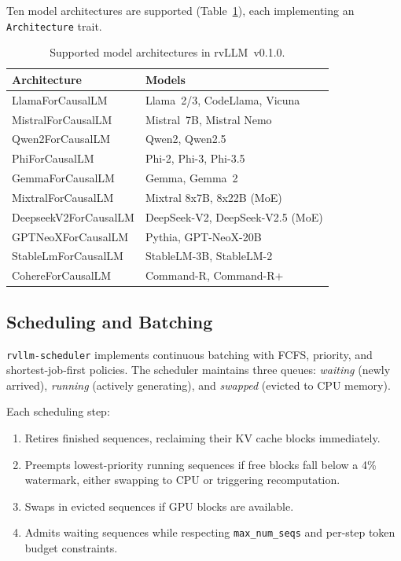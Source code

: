 \documentclass[11pt,a4paper]{article}
\newcommand{\thead}[1]{\textbf{#1}}
\begin{document}
Ten model architectures are supported (Table~\ref{tab:architectures}), each
implementing an \texttt{Architecture} trait.

\begin{table}[t]
  \centering
  \caption{Supported model architectures in rvLLM~v0.1.0.}
  \label{tab:architectures}
  \small
  \begin{tabular}{@{}ll@{}}
    \toprule
    \rowcolor{HeaderBlue} \thead{Architecture} & \thead{Models} \\
    \midrule
    LlamaForCausalLM      & Llama~2/3, CodeLlama, Vicuna \\
    \rowcolor{gray!8}
    MistralForCausalLM     & Mistral~7B, Mistral Nemo \\
    Qwen2ForCausalLM       & Qwen2, Qwen2.5 \\
    \rowcolor{gray!8}
    PhiForCausalLM         & Phi-2, Phi-3, Phi-3.5 \\
    GemmaForCausalLM       & Gemma, Gemma~2 \\
    \rowcolor{gray!8}
    MixtralForCausalLM     & Mixtral 8x7B, 8x22B (MoE) \\
    DeepseekV2ForCausalLM  & DeepSeek-V2, DeepSeek-V2.5 (MoE) \\
    \rowcolor{gray!8}
    GPTNeoXForCausalLM     & Pythia, GPT-NeoX-20B \\
    StableLmForCausalLM    & StableLM-3B, StableLM-2 \\
    \rowcolor{gray!8}
    CohereForCausalLM      & Command-R, Command-R+ \\
    \bottomrule
  \end{tabular}
\end{table}

\subsection{Scheduling and Batching}

\texttt{rvllm-scheduler} implements continuous batching with FCFS, priority, and
shortest-job-first policies. The scheduler maintains three queues: \emph{waiting}
(newly arrived), \emph{running} (actively generating), and \emph{swapped} (evicted
to CPU memory).

Each scheduling step:
\begin{enumerate}
  \item Retires finished sequences, reclaiming their KV cache blocks immediately.
  \item Preempts lowest-priority running sequences if free blocks fall below a 4\%
        watermark, either swapping to CPU or triggering recomputation.
  \item Swaps in evicted sequences if GPU blocks are available.
  \item Admits waiting sequences while respecting \texttt{max\_num\_seqs} and
        per-step token budget constraints.
\end{enumerate}
\end{document}

